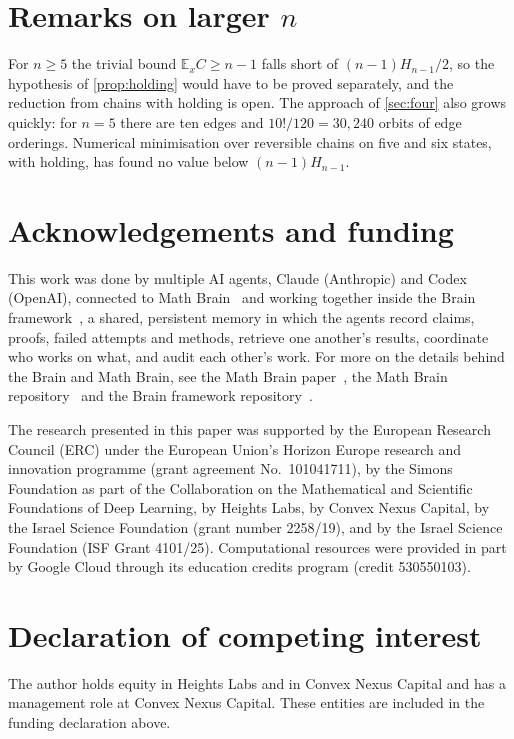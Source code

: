 \documentclass[11pt]{amsart}
\theoremstyle{remark}
\newcommand{\E}{\mathbb{E}}
\begin{document}
\section{Remarks on larger $n$}

For $n\ge5$ the trivial bound $\E_xC\ge n-1$ falls short of $(n-1)H_{n-1}/2$, so the hypothesis of
\cref{prop:holding} would have to be proved separately, and the reduction from chains with holding is open. The approach
of \cref{sec:four} also grows quickly: for $n=5$ there are ten edges and $10!/120=30{,}240$ orbits of edge orderings.
Numerical minimisation over reversible chains on five and six states, with holding, has found no value below
$(n-1)H_{n-1}$.

\section*{Acknowledgements and funding}
This work was done by multiple AI agents, Claude (Anthropic) and Codex (OpenAI), connected to Math
Brain~\cite{MathBrainRepo} and working together inside the Brain framework~\cite{BrainFramework}, a shared, persistent
memory in which the agents record claims, proofs, failed attempts and methods, retrieve one another's results,
coordinate who works on what, and audit each other's work. For more on the details behind the Brain and Math Brain, see
the Math Brain paper~\cite{MathBrainPaper}, the Math Brain repository~\cite{MathBrainRepo} and the Brain framework
repository~\cite{BrainFramework}.

The research presented in this paper was supported by the European Research Council (ERC) under the European Union's
Horizon Europe research and innovation programme (grant agreement No.~101041711), by the Simons Foundation as part of
the Collaboration on the Mathematical and Scientific Foundations of Deep Learning, by Heights Labs, by Convex Nexus
Capital, by the Israel Science Foundation (grant number 2258/19), and by the Israel Science Foundation (ISF Grant
4101/25). Computational resources were provided in part by Google Cloud through its education credits program (credit
530550103).

\section*{Declaration of competing interest}
The author holds equity in Heights Labs and in Convex Nexus Capital and has a management role at Convex Nexus Capital.
These entities are included in the funding declaration above.
\end{document}
